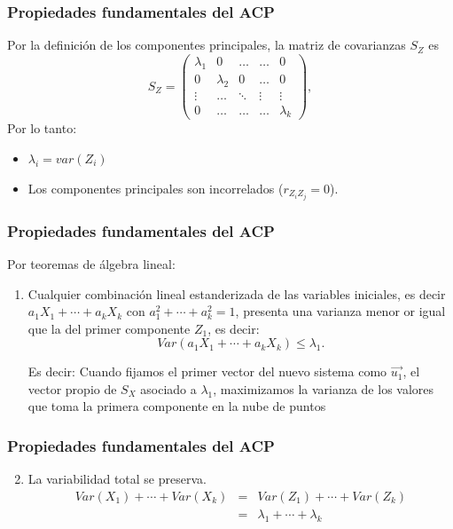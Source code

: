 \documentclass{beamer}
\begin{document}
  \begin{frame}\frametitle{Propiedades fundamentales del ACP}
  Por la definición de los componentes principales, la matriz de covarianzas $S_Z$ es
$$S_Z=\left(\begin{array}{lllll}
\lambda_1&0&\ldots&\ldots&0\\
0&\lambda_2&0&\ldots&0\\
\vdots&\ldots&\ddots&\vdots&\vdots\\
0&\ldots&\ldots&\ldots&\lambda_k
\end{array}\right),$$
 Por lo tanto: 
 \begin{itemize}
 \item<+-> $\lambda_i=var(Z_i)$
 \item<+-> Los componentes principales son incorrelados ($r_{Z_iZ_j}=0$).
 \end{itemize}

  \end{frame}
\begin{frame}\frametitle{Propiedades fundamentales del ACP}
  Por teoremas de álgebra lineal:
  \begin{enumerate}
\item<+-> Cualquier combinación lineal estanderizada de las variables iniciales, es decir $a_1X_1+\cdots+a_kX_k$ con $a_1^2+\cdots+a_k^2=1$, presenta una varianza menor or igual que la del primer componente $Z_1$, es decir:
$$Var(a_1X_1+\cdots+a_kX_k)\leq \lambda_1.$$
  \begin{block}{Es decir:}
    Cuando fijamos el primer vector del nuevo sistema como $\vec{u_1}$, el vector propio de $S_X$ asociado a $\lambda_1$, maximizamos la varianza de los valores  que toma la primera componente en la nube de puntos
  \end{block}

\end{enumerate}
  \end{frame}
\begin{frame}\frametitle{Propiedades fundamentales del ACP}

\begin{enumerate}
  \setcounter{enumi}{1}
\item<+-> La variabilidad total se preserva.
\begin{eqnarray*}
Var(X_1)+\cdots+Var(X_k)&=&Var(Z_1)+\cdots+Var(Z_k)\\
&=&\lambda_1+\cdots+\lambda_k\\
\end{eqnarray*}
\end{enumerate}
\end{frame}
\end{document}
